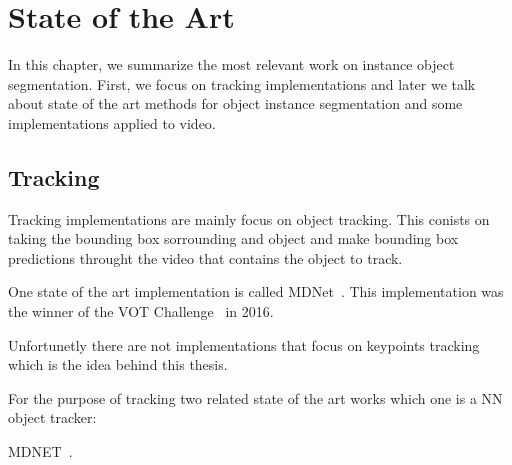 
\chapter{State of the Art}
\label{cha:stateofart}




In this chapter, we summarize the most relevant work on instance object segmentation. 
First, we focus on tracking implementations and later we talk about state of the art methods for object instance segmentation and some implementations applied to video.

\section{Tracking}

Tracking implementations are mainly focus on object tracking. This conists on taking the bounding box sorrounding and object and make bounding box predictions throught the video that contains the object to track.

One state of the art implementation is called MDNet~\cite{nam2016learning}.
This implementation was the winner of the VOT Challenge~\cite{VOT_TPAMI} in 2016.


Unfortunetly there are not implementations that focus on keypoints tracking which is the idea behind this thesis.


For the purpose of tracking two related state of the art works which one is a NN object tracker:

MDNET~\cite{nam2016learning}.

